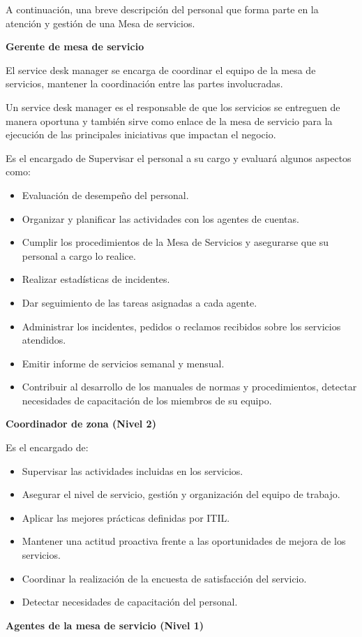 A continuación, una breve descripción del personal que forma parte en la atención y gestión de una Mesa de servicios.

\textbf{Gerente de mesa de servicio}



El service desk manager se encarga de coordinar el equipo de la mesa de servicios, mantener la coordinación entre las partes involucradas. 

Un service desk manager es el responsable de que los servicios se entreguen de manera oportuna y también sirve como enlace de la mesa de servicio para la ejecución de las principales iniciativas que impactan el negocio.

Es el encargado de Supervisar el personal a su cargo y evaluará algunos aspectos como:

\begin{itemize}
	\item 	Evaluación de desempeño del personal.
\item 		Organizar y planificar las actividades con los agentes de cuentas.
	\item 	Cumplir los procedimientos de la Mesa de Servicios y asegurarse que su personal a cargo lo realice.
\item 		Realizar estadísticas de incidentes.
\item 		Dar seguimiento de las tareas asignadas a cada agente.
\item 		Administrar los incidentes, pedidos o reclamos recibidos sobre los servicios atendidos.
\item 		Emitir informe de servicios semanal y mensual.
\item 		Contribuir al desarrollo de los manuales de normas y procedimientos, detectar necesidades de capacitación de los miembros de su equipo.
	
\end{itemize}

\textbf{Coordinador de zona (Nivel 2)}

Es el encargado de:
\begin{itemize}
\item Supervisar las actividades incluidas en los servicios.
\item Asegurar el nivel de servicio, gestión y organización del equipo de trabajo.
\item Aplicar las mejores prácticas definidas por ITIL. 
\item Mantener una actitud proactiva frente a las oportunidades de mejora de los servicios.
\item Coordinar la realización de la encuesta de satisfacción del servicio.
\item Detectar necesidades de capacitación del personal.

\end{itemize}
\textbf{Agentes de la mesa de servicio (Nivel 1)}

